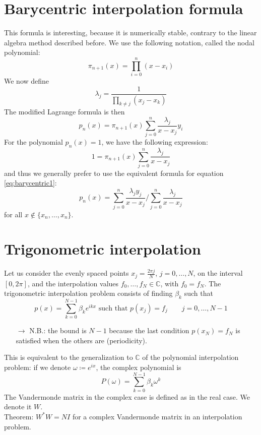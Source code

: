 \documentclass[12pt, openany]{report}
\theoremstyle{definition}
\begin{document}
\section{Barycentric interpolation formula}
This formula is interesting, because it is numerically stable, contrary to the linear algebra method described before. We use the following notation, called the nodal polynomial:
\begin{equation}
    \pi_{n+1}(x) = \prod_{i=0}^n (x-x_i)
\end{equation}
We now define 
\begin{equation}
    \lambda_j = \frac{1}{\prod_{k\neq j}(x_j-x_k)}
\end{equation}
The modified Lagrange formula is then 
\begin{equation}\label{eq:barycentric1}
    p_n(x) = \pi_{n+1}(x) \sum_{j=0}^n \frac{\lambda_j}{x-x_j}y_i
\end{equation}
For the polynomial \(p_n(x) = 1\), we have the following expression:\[1 = \pi_{n+1}(x) \sum_{j=0}^n \frac{\lambda_j}{x-x_j}\] and thus we generally prefer to use the equivalent formula for equation \eqref{eq:barycentric1}:
\begin{equation}\label{eq:barycentric2}
    p_n(x) = \sum_{j=0}^n \frac{\lambda_jy_j}{x-x_j} / \sum_{j=0}^n \frac{\lambda_j}{x-x_j}
\end{equation}
for all \(x\notin \{x_n,\dots,x_n\}\).
\section{Trigonometric interpolation}
Let us consider the evenly spaced points \(x_j = \frac{2\pi j}{N}\), \(j=0,\dots,N\), on the interval \([0,2\pi]\), and the interpolation values \(f_0,\dots, f_N\in \mathbb{C}\), with \(f_0=f_N\). The trigonometric interpolation problem consists of finding \(\beta_k\) such that 
\begin{equation}
    p(x) = \sum_{k=0}^{N-1}\beta_ke^{ikx}\text{ such that } p(x_j) = f_j\qquad j=0,\dots,N-1
\end{equation}
\begin{itemize}
    \item [\(\rightarrow\)] N.B.: the bound is \(N-1\) because the last condition \(p(x_N) = f_N\) is satisfied when the others are (periodicity). 
\end{itemize}
This is equivalent to the generalization to \(\mathbb{C}\) of the polynomial interpolation problem: if we denote \(\omega \coloneqq e^{ix}\), the complex polynomial is 
\begin{equation}
    P(\omega) = \sum_{k=0}^{N-1} \beta_k \omega^k
\end{equation}
The Vandermonde matrix in the complex case is defined as in the real case. We denote it \(W\). \\
Theorem: \(W^*W=NI\) for a complex Vandermonde matrix in an interpolation problem. \\
\end{document}
